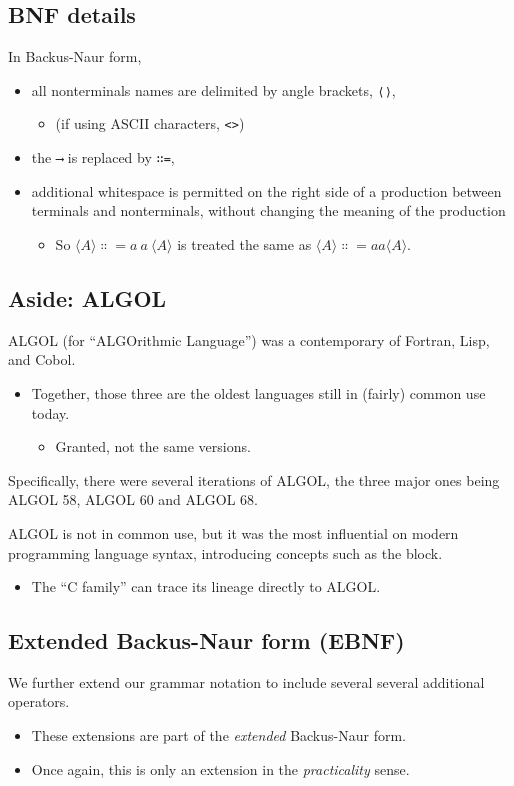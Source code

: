 \documentclass[11pt]{article}
\theoremstyle{definition}
\begin{document}
\subsection{BNF details}
\label{sec:orgcdc3693}
In Backus-Naur form,
\begin{itemize}
\item all nonterminals names are delimited by
angle brackets, \texttt{⟨⟩},
\begin{itemize}
\item (if using ASCII characters, \texttt{<>})
\end{itemize}
\item the \texttt{⟶} is replaced by \texttt{∷=},
\item additional whitespace is permitted on the right side
of a production between terminals and nonterminals,
without changing the meaning of the production
\begin{itemize}
\item So \(⟨A⟩ ∷= a\ a\ ⟨A⟩\) is treated the same as \(⟨A⟩ ∷= aa⟨A⟩\).
\end{itemize}
\end{itemize}

\subsection{Aside: ALGOL}
\label{sec:orgee8aa97}
ALGOL (for “ALGOrithmic Language”)
was a contemporary of Fortran, Lisp, and Cobol.
\begin{itemize}
\item Together, those three are the oldest languages
still in (fairly) common use today.
\begin{itemize}
\item Granted, not the same versions.
\end{itemize}
\end{itemize}

Specifically, there were several iterations of ALGOL,
the three major ones being ALGOL 58, ALGOL 60 and ALGOL 68.

ALGOL is not in common use, but it was
the most influential on modern programming language syntax,
introducing concepts such as the block.
\begin{itemize}
\item The “C family” can trace its lineage directly to ALGOL.
\end{itemize}

\subsection{Extended Backus-Naur form (EBNF)}
\label{sec:org41b6b47}
We further extend our grammar notation to include several
several additional operators.
\begin{itemize}
\item These extensions are part of the \emph{extended} Backus-Naur form.
\item Once again, this is only an extension in the \emph{practicality} sense.
\end{itemize}
\end{document}
